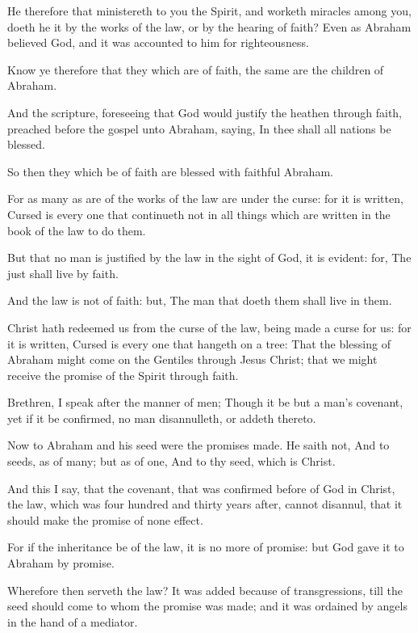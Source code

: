 \verse He therefore that ministereth to you the Spirit, and worketh miracles among you, doeth he it by the works of the law, or by the hearing of faith?  \verse Even as Abraham believed God, and it was accounted to him for righteousness.

\verse Know ye therefore that they which are of faith, the same are the children of Abraham.

\verse And the scripture, foreseeing that God would justify the heathen through faith, preached before the gospel unto Abraham, saying, In thee shall all nations be blessed.

\verse So then they which be of faith are blessed with faithful Abraham.

\verse For as many as are of the works of the law are under the curse: for it is written, Cursed is every one that continueth not in all things which are written in the book of the law to do them.

\verse But that no man is justified by the law in the sight of God, it is evident: for, The just shall live by faith.

\verse And the law is not of faith: but, The man that doeth them shall live in them.

\verse Christ hath redeemed us from the curse of the law, being made a curse for us: for it is written, Cursed is every one that hangeth on a tree: \verse That the blessing of Abraham might come on the Gentiles through Jesus Christ; that we might receive the promise of the Spirit through faith.

\verse Brethren, I speak after the manner of men; Though it be but a man's covenant, yet if it be confirmed, no man disannulleth, or addeth thereto.

\verse Now to Abraham and his seed were the promises made. He saith not, And to seeds, as of many; but as of one, And to thy seed, which is Christ.

\verse And this I say, that the covenant, that was confirmed before of God in Christ, the law, which was four hundred and thirty years after, cannot disannul, that it should make the promise of none effect.

\verse For if the inheritance be of the law, it is no more of promise: but God gave it to Abraham by promise.

\verse Wherefore then serveth the law? It was added because of transgressions, till the seed should come to whom the promise was made; and it was ordained by angels in the hand of a mediator.


